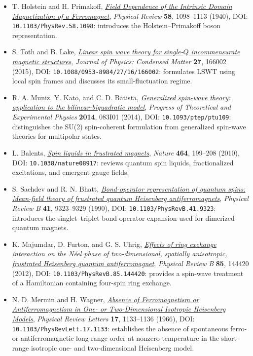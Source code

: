 \begin{itemize}
\tightlist
\item
  T. Holstein and H. Primakoff, \href{https://doi.org/10.1103/PhysRev.58.1098}{\emph{Field Dependence of the Intrinsic Domain Magnetization of a Ferromagnet}}, \emph{Physical Review} \textbf{58}, 1098--1113 (1940), DOI: \texttt{10.1103/PhysRev.58.1098}: introduces the Holstein--Primakoff boson representation.
\item
  S. Toth and B. Lake, \href{https://doi.org/10.1088/0953-8984/27/16/166002}{\emph{Linear spin wave theory for single-\(Q\) incommensurate magnetic structures}}, \emph{Journal of Physics: Condensed Matter} \textbf{27}, 166002 (2015), DOI: \texttt{10.1088/0953-8984/27/16/166002}: formulates LSWT using local spin frames and discusses its small-fluctuation regime.
\item
  R. A. Muniz, Y. Kato, and C. D. Batista, \href{https://doi.org/10.1093/ptep/ptu109}{\emph{Generalized spin-wave theory: application to the bilinear-biquadratic model}}, \emph{Progress of Theoretical and Experimental Physics} \textbf{2014}, 083I01 (2014), DOI: \texttt{10.1093/ptep/ptu109}: distinguishes the SU(2) spin-coherent formulation from generalized spin-wave theories for multipolar states.
\item
  L. Balents, \href{https://doi.org/10.1038/nature08917}{\emph{Spin liquids in frustrated magnets}}, \emph{Nature} \textbf{464}, 199--208 (2010), DOI: \texttt{10.1038/nature08917}: reviews quantum spin liquids, fractionalized excitations, and emergent gauge fields.
\item
  S. Sachdev and R. N. Bhatt, \href{https://doi.org/10.1103/PhysRevB.41.9323}{\emph{Bond-operator representation of quantum spins: Mean-field theory of frustrated quantum Heisenberg antiferromagnets}}, \emph{Physical Review B} \textbf{41}, 9323--9329 (1990), DOI: \texttt{10.1103/PhysRevB.41.9323}: introduces the singlet--triplet bond-operator expansion used for dimerized quantum magnets.
\item
  K. Majumdar, D. Furton, and G. S. Uhrig, \href{https://doi.org/10.1103/PhysRevB.85.144420}{\emph{Effects of ring exchange interaction on the Néel phase of two-dimensional, spatially anisotropic, frustrated Heisenberg quantum antiferromagnet}}, \emph{Physical Review B} \textbf{85}, 144420 (2012), DOI: \texttt{10.1103/PhysRevB.85.144420}: provides a spin-wave treatment of a Hamiltonian containing four-spin ring exchange.
\item
  N. D. Mermin and H. Wagner, \href{https://doi.org/10.1103/PhysRevLett.17.1133}{\emph{Absence of Ferromagnetism or Antiferromagnetism in One- or Two-Dimensional Isotropic Heisenberg Models}}, \emph{Physical Review Letters} \textbf{17}, 1133--1136 (1966), DOI: \texttt{10.1103/PhysRevLett.17.1133}: establishes the absence of spontaneous ferro- or antiferromagnetic long-range order at nonzero temperature in the short-range isotropic one- and two-dimensional Heisenberg model.
\end{itemize}

